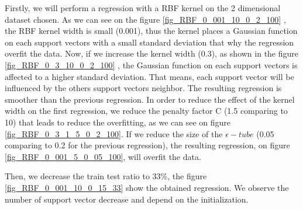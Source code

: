 Firstly, we will perform a regression with a RBF kernel on the 2 dimensional dataset chosen. As we can see on the figure \ref{fig_RBF_0_001_10_0_2_100}
, the RBF kernel width is small (0.001), thus the kernel places a Gaussian function on each support vectors with a small standard deviation that why the regression overfit the data. Now, if we increase the kernel width (0.3), as shown in the figure \ref{fig_RBF_0_3_10_0_2_100}
, the  Gaussian function on each support vectors is affected to a higher standard deviation. That means, each support vector will be influenced by the others support vectors neighbor. The resulting regression is smoother than the previous regression.
In order to reduce the effect of the kernel width on the first regression, we reduce the penalty factor C (1.5 comparing to 10) that leads to reduce the overfitting, as we can see on figure \ref{fig_RBF_0_3_1_5_0_2_100}.
If we reduce the size of the $\epsilon-tube$ (0.05 comparing to 0.2 for the previous regression), the resulting regression, on figure \ref{fig_RBF_0_001_5_0_05_100}, will overfit the data. 

Then, we decrease the train test ratio to 33\%, the figure \ref{fig_RBF_0_001_10_0_15_33} show the obtained regression. We observe the number of support vector decrease and depend on the initialization.

